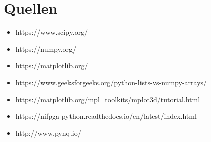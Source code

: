 \documentclass[11pt]{article}
\providecommand{\tightlist}{%
      \setlength{\itemsep}{0pt}\setlength{\parskip}{0pt}}
\begin{document}
    \hypertarget{quellen}{%
\section{Quellen}\label{quellen}}

\begin{itemize}
\tightlist
\item
  https://www.scipy.org/
\item
  https://numpy.org/
\item
  https://matplotlib.org/
\item
  https://www.geeksforgeeks.org/python-lists-vs-numpy-arrays/
\item
  https://matplotlib.org/mpl\_toolkits/mplot3d/tutorial.html
\item
  https://nifpga-python.readthedocs.io/en/latest/index.html
\item
  http://www.pynq.io/
\end{itemize}


    
    
    
\end{document}
